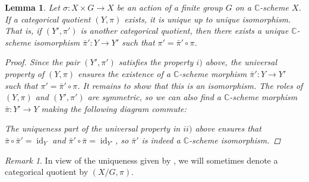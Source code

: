 \documentclass[12pt,a4paper]{amsart}
\theoremstyle{plain}
\newtheorem{lm}[thm]{Lemma}
\theoremstyle{definition}
\theoremstyle{remark}
\newtheorem{rem}[thm]{Remark}
\begin{document}
\begin{lm}\label{lm:uniquequotient}
  Let $\sigma \colon X \times G \to X$ be an action of a finite group $G$ on a $\mathbb{C}$-scheme $X$.
  If a categorical quotient $(Y,\pi)$ exists, it is unique up to unique isomorphism.
  That is, if $(Y', \pi')$ is another categorical quotient, then there exists a unique $\mathbb{C}$-scheme isomorphism $\bar{\pi}' \colon Y \to Y'$ such that $\pi' = \bar{\pi}' \circ \pi$.
  
  \begin{proof}
    Since the pair $(Y', \pi')$ satisfies the property $i)$ above, the universal property of $(Y, \pi)$ ensures the existence of a $\mathbb{C}$-scheme morphism $\bar{\pi}' \colon Y \to Y'$ such that $\pi' = \bar{\pi}' \circ \pi$.
    It remains to show that this is an isomorphism.
    The roles of $(Y, \pi)$ and $(Y', \pi')$ are symmetric, so we can also find a $\mathbb{C}$-scheme morphism $\bar{\pi} \colon Y' \to Y$ making the following diagram commute:

    \begin{center}
    \end{center}

    The uniqueness part of the universal property in $ii)$ above ensures that $\bar{\pi} \circ \bar{\pi}' = \operatorname{id}_{Y}$ and $\bar{\pi}' \circ \bar{\pi} = \operatorname{id}_{Y'}$, so $\bar{\pi}'$ is indeed a $\mathbb{C}$-scheme isomorphism.

  \end{proof}
\end{lm}

\begin{rem}
  In view of the uniqueness given by , we will sometimes denote a categorical quotient by $(X/G, \pi)$.
\end{rem}
\end{document}
